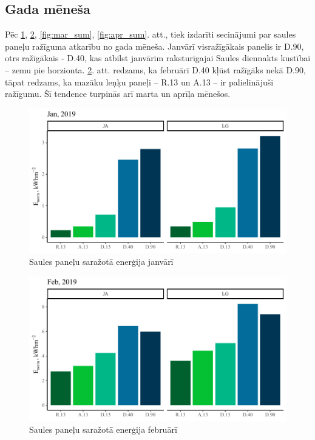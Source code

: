 
\subsection{Gada mēneša} \label{subsection:gads}
Pēc \ref{fig:jan_sum}, \ref{fig:feb_sum}, \ref{fig:mar_sum}, \ref{fig:apr_sum}. att., tiek izdarīti secinājumi par saules paneļu ražīguma atkarību no gada mēneša. Janvārī visražīgākais panelis ir D.90, otrs ražīgākais - D.40, kas atbilst janvārim raksturīgajai Saules diennakts kustībai -- zemu pie horzionta. \ref{fig:feb_sum}. att. redzams, ka februārī D.40 kļūst ražīgāks nekā D.90, tāpat redzams, ka mazāku leņķu paneļi -- R.13 un A.13 -- ir palielinājuši ražīgumu. Šī tendence turpinās arī marta un aprīļa mēnešos.

\begin{figure}[h]
    \centering
    \includegraphics[width=\linewidth]{figures/sol_month/jan_m_m2.pdf}
    \caption{Saules paneļu saražotā enerģija janvārī}
    \label{fig:jan_sum}
\end{figure}

\begin{figure}[h]
    \centering
    \includegraphics[width=\linewidth]{figures/sol_month/feb_m_m2.pdf}
    \caption{Saules paneļu saražotā enerģija februārī}
    \label{fig:feb_sum}
\end{figure}

